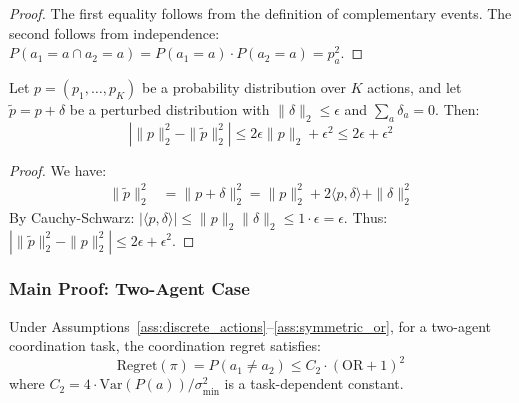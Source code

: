 \begin{proof}
The first equality follows from the definition of complementary events. The second follows from independence: $P(a_1 = a \cap a_2 = a) = P(a_1 = a) \cdot P(a_2 = a) = p_a^2$.
\end{proof}

\begin{lemma}
\label{lem:perturbation}
Let $p = (p_1, \ldots, p_K)$ be a probability distribution over $K$ actions, and let $\tilde{p} = p + \delta$ be a perturbed distribution with $\|\delta\|_2 \leq \epsilon$ and $\sum_a \delta_a = 0$. Then:
\begin{equation}
\left| \|p\|_2^2 - \|\tilde{p}\|_2^2 \right| \leq 2\epsilon \|p\|_2 + \epsilon^2 \leq 2\epsilon + \epsilon^2
\end{equation}
\end{lemma}

\begin{proof}
We have:
\begin{align}
\|\tilde{p}\|_2^2 &= \|p + \delta\|_2^2 = \|p\|_2^2 + 2\langle p, \delta \rangle + \|\delta\|_2^2
\end{align}
By Cauchy-Schwarz: $|\langle p, \delta \rangle| \leq \|p\|_2 \|\delta\|_2 \leq 1 \cdot \epsilon = \epsilon$.
Thus: $|\|\tilde{p}\|_2^2 - \|p\|_2^2| \leq 2\epsilon + \epsilon^2$.
\end{proof}

\subsubsection{Main Proof: Two-Agent Case}

\begin{theorem}[Quadratic Regret Bound, $m=2$]
\label{thm:quadratic_two}
Under Assumptions~\ref{ass:discrete_actions}--\ref{ass:symmetric_or}, for a two-agent coordination task, the coordination regret satisfies:
\begin{equation}
\text{Regret}(\pi) = P(a_1 \neq a_2) \leq C_2 \cdot (\text{OR} + 1)^2
\end{equation}
where $C_2 = 4 \cdot \text{Var}(P(a)) / \sigma^2_{\min}$ is a task-dependent constant.
\end{theorem}

